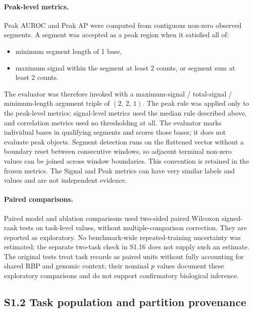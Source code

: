 \documentclass[11pt]{article}
\begin{document}
\paragraph{Peak-level metrics.} Peak AUROC and Peak AP were computed from contiguous non-zero observed segments. A segment was accepted as a peak region when it satisfied all of:

\begin{itemize}
\item minimum segment length of 1 base,
\item maximum signal within the segment at least 2 counts, or segment sum at least 2 counts.
\end{itemize}

The evaluator was therefore invoked with a maximum-signal / total-signal / minimum-length argument triple of $(2,\,2,\,1)$. The peak rule was applied only to the peak-level metrics; signal-level metrics used the median rule described above, and correlation metrics used no thresholding at all. The evaluator marks individual bases in qualifying segments and scores those bases; it does not evaluate peak objects. Segment detection runs on the flattened vector without a boundary reset between consecutive windows, so adjacent terminal non-zero values can be joined across window boundaries. This convention is retained in the frozen metrics. The Signal and Peak metrics can have very similar labels and values and are not independent evidence.

\paragraph{Paired comparisons.} Paired model and ablation comparisons used two-sided paired Wilcoxon signed-rank tests on task-level values, without multiple-comparison correction. They are reported as exploratory. No benchmark-wide repeated-training uncertainty was estimated; the separate two-task check in S1.16 does not supply such an estimate. The original tests treat task records as paired units without fully accounting for shared RBP and genomic context; their nominal $p$ values document these exploratory comparisons and do not support confirmatory biological inference.

\subsection*{S1.2 Task population and partition provenance}
\end{document}
